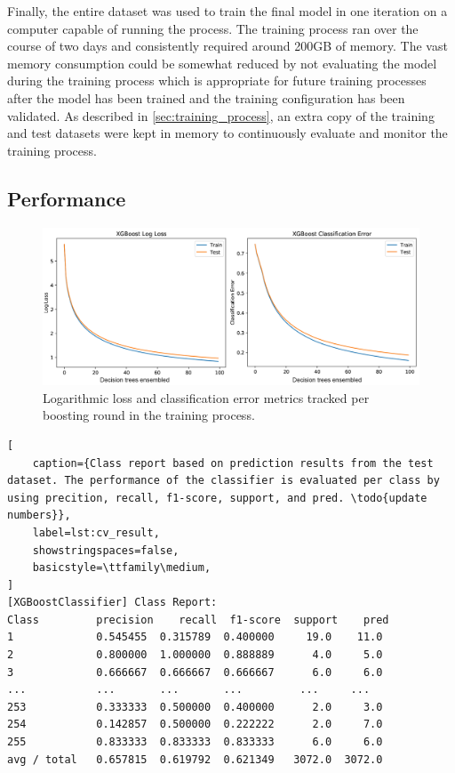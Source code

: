 Finally, the entire dataset was used to train the final model in one iteration on a computer capable of running the process. The training process ran over the course of two days and consistently required around 200GB of memory. The vast memory consumption could be somewhat reduced by not evaluating the model during the training process which is appropriate for future training processes after the model has been trained and the training configuration has been validated. As described in \cref{sec:training_process}, an extra copy of the training and test datasets were kept in memory to continuously evaluate and monitor the training process.

\subsection{Performance}

\begin{figure}[htbp]
    \centering
    \includegraphics[width=1.0\textwidth]{figures/results/eval_set}
    \caption{Logarithmic loss and classification error metrics tracked per boosting round in the training process.}
    \label{fig:eval_set}
\end{figure}


\begin{lstlisting}[
    caption={Class report based on prediction results from the test dataset. The performance of the classifier is evaluated per class by using precition, recall, f1-score, support, and pred. \todo{update numbers}},
    label=lst:cv_result,
    showstringspaces=false,
    basicstyle=\ttfamily\medium,
]
[XGBoostClassifier] Class Report:
Class         precision    recall  f1-score  support    pred
1             0.545455  0.315789  0.400000     19.0    11.0
2             0.800000  1.000000  0.888889      4.0     5.0
3             0.666667  0.666667  0.666667      6.0     6.0
...           ...       ...       ...         ...     ...
253           0.333333  0.500000  0.400000      2.0     3.0
254           0.142857  0.500000  0.222222      2.0     7.0
255           0.833333  0.833333  0.833333      6.0     6.0
avg / total   0.657815  0.619792  0.621349   3072.0  3072.0
\end{lstlisting}


